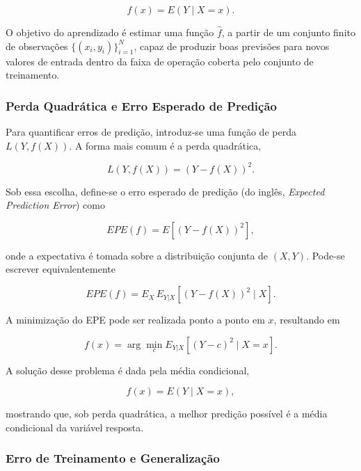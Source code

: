 \begin{equation}
f(x) = E(Y \mid X = x).
\end{equation}

O objetivo do aprendizado é estimar uma função \(\hat{f}\), a partir de um conjunto finito de observações \(\{(x_i, y_i)\}_{i=1}^{N}\), capaz de produzir boas previsões para novos valores de entrada dentro da faixa de operação coberta pelo conjunto de treinamento.

\subsubsection*{Perda Quadrática e Erro Esperado de Predição}

Para quantificar erros de predição, introduz-se uma função de perda $L(Y,f(X))$. A forma mais comum é a perda quadrática,

\begin{equation}
L(Y,f(X)) = (Y - f(X))^2.
\end{equation}

Sob essa escolha, define-se o erro esperado de predição (do inglês, \textit{Expected Prediction Error}) como

\begin{equation}
EPE(f) = E[(Y - f(X))^2],
\end{equation}

onde a expectativa é tomada sobre a distribuição conjunta de $(X,Y)$. Pode-se escrever equivalentemente

\begin{equation}
EPE(f) = E_X \, E_{Y|X} \left[(Y - f(X))^2 \mid X \right].
\end{equation}

A minimização do EPE pode ser realizada ponto a ponto em $x$, resultando em

\begin{equation}
f(x) = \arg\min_c E_{Y|X} \left[(Y - c)^2 \mid X = x \right].
\end{equation}

A solução desse problema é dada pela média condicional,

\begin{equation}
f(x) = E(Y \mid X = x),
\end{equation}

mostrando que, sob perda quadrática, a melhor predição possível é a média condicional da variável resposta.

\subsubsection*{Erro de Treinamento e Generalização}

